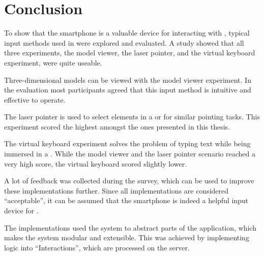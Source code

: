 \chapter{Conclusion}\label{chapter:conclusion}

To show that the smartphone is a valuable device for interacting with , typical input methods used in  were explored and evaluated. A  study showed that all three experiments, the model viewer, the laser pointer, and the virtual keyboard experiment, were quite useable.

Three-dimensional models can be viewed with the model viewer experiment. In the evaluation most participants agreed that this input method is intuitive and effective to operate.

The laser pointer is used to select elements in a  or for similar pointing tasks. This experiment scored the highest amongst the ones presented in this thesis. 

The virtual keyboard experiment solves the problem of typing text while being immersed in a . While the model viewer and the laser pointer scenario reached a very high score, the virtual keyboard scored slightly lower. 

A lot of feedback was collected during the survey, which can be used to improve these implementations further. Since all implementations are considered \enquote{acceptable}, it can be assumed that the smartphone is indeed a helpful input device for .

The implementations used the  system to abstract parts of the application, which makes the system modular and extensible. This was achieved by implementing logic into \enquote{Interactions}, which are processed on the server. 
